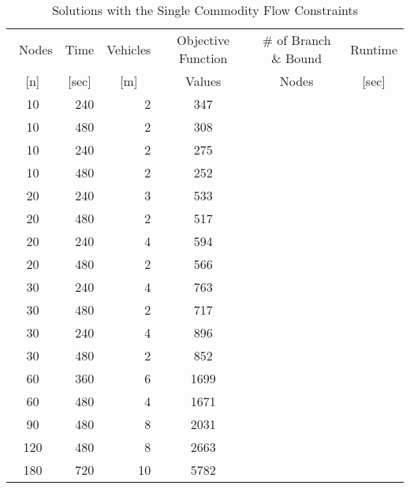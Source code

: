 \documentclass[a4paper]{article}
\begin{document}
\begin{table}[h!]
	\centering
	\caption{Solutions with the Single Commodity Flow Constraints}
		\begin{tabular}{|c|r|r||c|c|c|}
			\hline\
		Nodes & Time & Vehicles	& Objective Function & \# of Branch \& Bound & Runtime\\
   		\multicolumn{1}{|c|}{[n]} & \multicolumn{1}{c|}{[sec]} & \multicolumn{1}{c||}{[m]} & \multicolumn{1}{c|}{Values} & \multicolumn{1}{c|}{Nodes} & \multicolumn{1}{c|}{[sec]} \\
			\hline 
				10	&	240	&	2	&	347		&		&		\\
				10	&	480	&	2	&	308		&		&		\\
				10	&	240	&	2	&	275		&		&		\\
				10	&	480	&	2	&	252		&		&		\\
				20	&	240	&	3	&	533		&		&		\\
				20	&	480	&	2	&	517		&		&		\\
				20	&	240	&	4	&	594		&		&		\\
				20	&	480	&	2	&	566		&		&		\\
				30	&	240	&	4	&	763		&		&		\\
				30	&	480	&	2	&	717		&		&		\\
				30	&	240	&	4	&	896		&		&		\\
				30	&	480	&	2	&	852		&		&		\\
				60	&	360	&	6	&	1699	&		&		\\
				60	&	480	&	4	&	1671	&		&		\\
				90	&	480	&	8	&	2031	&		&		\\
				120	&	480	&	8	&	2663	&		&		\\
				180	&	720	&	10	&	5782	&		&		\\
				
			\hline 
		\end{tabular}
	\label{tab:scf}
\end{table}
\end{document}

